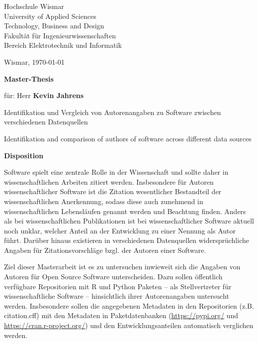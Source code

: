 \documentclass[a4paper,DIV=12]{scrartcl}
\begin{document}
\thispagestyle{empty}

\vspace*{.2cm}

\begin{minipage}{.7\textwidth}
Hochschule Wismar\\
University of Applied Sciences\\
Technology, Business and Design\\
Fakultät für Ingenieurwissenschaften\\
Bereich Elektrotechnik und Informatik\\
\end{minipage}\hfill
\begin{minipage}{.3\textwidth}
    Wismar, \today{}
    
    \vfill{}
\end{minipage}


{\Large\centerline{\textbf{Master-Thesis}}}

\vspace*{1em}

für: Herr \textbf{Kevin Jahrens}

\vspace*{1em}

Identifikation und Vergleich von Autorenangaben zu Software zwischen verschiedenen Datenquellen

\noindent\makebox[\linewidth]{\rule{\linewidth}{0.4pt}}
Identifikation and comparison of authors of software across different data sources

\noindent\makebox[\linewidth]{\rule{\linewidth}{0.4pt}}

\textbf{Disposition}
\vspace*{.1cm}

Software spielt eine zentrale Rolle in der Wissenschaft und sollte daher in wissenschaftlichen Arbeiten zitiert werden.
Insbesondere für Autoren wissenschaftlicher Software ist die Zitation wesentlicher Bestandteil der wissenschaftlichen Anerkennung, sodass diese auch zunehmend in wissenschaftlichen Lebensläufen genannt werden und Beachtung finden.
Anders als bei wissenschaftlichen Publikationen ist bei wissenschaftlicher Software aktuell noch unklar, welcher Anteil an der Entwicklung zu einer Nennung als Autor führt.
Darüber hinaus existieren in verschiedenen Datenquellen widersprüchliche Angaben für Zitationsvorschläge bzgl. der Autoren einer Software.

Ziel dieser Masterarbeit ist es zu untersuchen inwieweit sich die Angaben von Autoren für Open Source Software unterscheiden. 
Dazu sollen öffentlich verfügbare Repositorien mit R und Python Paketen -- als Stellvertreter für wissenschaftliche Software -- hinsichtlich ihrer Autorenangaben untersucht werden.
Insbesondere sollen die angegebenen Metadaten in den Repositorien (z.B. citation.cff) mit den Metadaten in Paketdatenbanken (\url{https://pypi.org/} und \url{https://cran.r-project.org/}) und den Entwicklungsanteilen automatisch verglichen werden.
\end{document}
